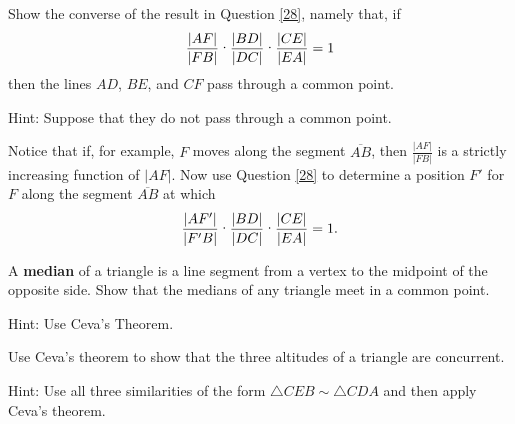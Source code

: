 \documentclass{ximera}
\begin{document}
\begin{question}
Show the converse of the result in Question \ref{28}, namely
that, if%
\[
\frac{\left\vert AF\right\vert }{\left\vert FB\right\vert }%
\text{\textperiodcentered}\frac{\left\vert BD\right\vert }{\left\vert
DC\right\vert }\text{\textperiodcentered}\frac{\left\vert CE\right\vert
}{\left\vert EA\right\vert }=1
\]
then the lines $AD$, $BE$, and $CF$ pass through a common point.

Hint: Suppose that they do not pass through a common point.
\begin{image}
\end{image}
Notice that if, for example, $F$ moves along the segment
$\overline{AB}$, then $\frac{\left\vert AF\right\vert }{\left\vert
FB\right\vert }$ is a strictly increasing function of $\left\vert
AF\right\vert $. Now use Question \ref{28} to determine a position
$F'$ for $F$ along the segment $\overline{AB}$ at which
\[
\frac{\left\vert AF'\right\vert }{\left\vert F'B\right\vert
}\text{\textperiodcentered}\frac{\left\vert BD\right\vert }{\left\vert
DC\right\vert }\text{\textperiodcentered}\frac{\left\vert CE\right\vert
}{\left\vert EA\right\vert }=1.
\]
\end{question}

\begin{question}
A \textbf{median} of a triangle is a line segment from a vertex
to the midpoint of the opposite side. Show that the medians of any triangle
meet in a common point.

Hint: Use Ceva's Theorem.
\end{question}

\begin{question}
Use Ceva's theorem to show that the three altitudes of a
triangle are concurrent.
\begin{image}
\end{image}
Hint: Use all three similarities of the form $\triangle
CEB\sim\triangle CDA$ and then apply Ceva's theorem.
\end{question}
\end{document}
